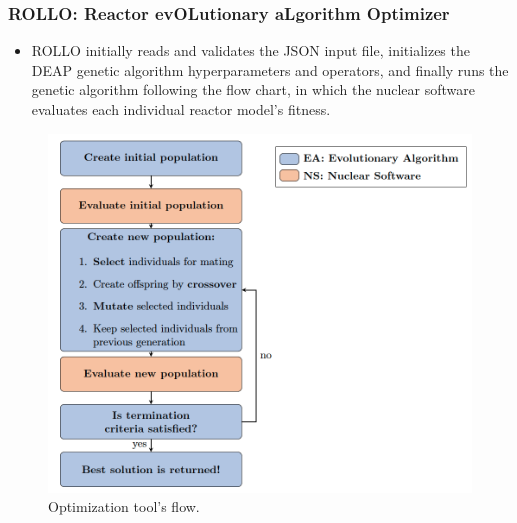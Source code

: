 \begin{frame}
    \frametitle{ROLLO: Reactor evOLutionary aLgorithm Optimizer}
    \begin{minipage}[c]{0.45\textwidth}
        \begin{itemize}
            \item ROLLO initially reads and validates the JSON input file, initializes 
            the DEAP genetic algorithm hyperparameters and operators, and finally runs
            the genetic algorithm following the flow chart, in which the nuclear 
            software evaluates each individual reactor model's fitness.
        \end{itemize}
        \end{minipage}\hfill
        \begin{minipage}[c]{0.52\textwidth}
            \centering
            \begin{figure}
                \includegraphics[width=\linewidth]{figures/rollo-flow.png} 
                \caption{Optimization tool's flow.}
            \end{figure}
        \end{minipage}
\end{frame}

